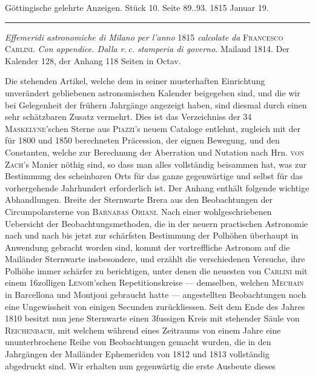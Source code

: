 \clearpage
{}
\hypertarget{native-579-lower}{}
\begin{center}\small Göttingische gelehrte Anzeigen. Stück 10. Seite 89..93. 1815 Januar 19.\\[3pt]\rule{.72\linewidth}{.3pt}\end{center}

{\setlength{\rightskip}{0pt plus 3em}\emph{Effemeridi astronomiche di Milano per l'anno} 1815 \emph{calcolate da} \textsc{Francesco Carlini}.
\emph{Con appendice. Dalla r.\,c. stamperia di governo.} Mailand 1814. Der Kalender 128, der
Anhang 118 Seiten in Octav.\par}

Die stehenden Artikel, welche dem in seiner musterhaften Einrichtung unverändert gebliebenen
astronomischen Kalender beigegeben sind, und die wir bei Gelegenheit der frühern Jahrgänge
angezeigt haben, sind diesmal durch einen sehr schätzbaren Zusatz vermehrt. Dies ist das
Verzeichniss der 34 \textsc{Maskelyne}'schen Sterne aus \textsc{Piazzi}'s neuem Cataloge
entlehnt, zugleich mit der für 1800 und 1850 berechneten Präcession, der eignen Bewegung, und
den Constanten, welche zur Berechnung der Aberration und Nutation nach Hrn. \textsc{von Zach}'s
Manier nöthig sind, so dass man alles vollständig beisammen hat, was zur Bestimmung des
scheinbaren Orts für das ganze gegenwärtige und selbst für das vorhergehende Jahrhundert
erforderlich ist. Der Anhang enthält folgende wichtige Abhandlungen. Breite der Sternwarte Brera
aus den Beobachtungen der Circumpolarsterne von \textsc{Barnabas Oriani}. Nach einer
wohlgeschriebenen Uebersicht der Beobachtungsmethoden, die in der neuern practischen Astronomie
nach und nach bis jetzt zur schärfsten Bestimmung der Polhöhen überhaupt in Anwendung gebracht
worden sind, kommt der vortreffliche Astronom auf die Mailänder Sternwarte insbesondere, und
erzählt die verschiedenen Versuche, ihre Polhöhe immer schärfer zu berichtigen, unter denen die
neuesten von \textsc{Carlini} mit einem 16zolligen \textsc{Lenoir}'schen Repetitionskreise —
demselben, welchen \textsc{Mechain} in Barcellona und Montjoui gebraucht hatte — angestellten
Beobachtungen noch eine Ungewissheit von einigen Secunden zurückliessen. Seit dem Ende des
Jahres 1810 besitzt nun jene Sternwarte einen 3fussigen Kreis mit stehender Säule von
\textsc{Reichenbach}, mit welchem während eines Zeitraums von einem Jahre eine ununterbrochene
Reihe von Beobachtungen gemacht wurden, die in den Jahrgängen der Mailänder Ephemeriden von 1812
und 1813 vollständig abgedruckt sind. Wir erhalten nun gegenwärtig die erste Ausbeute dieses
